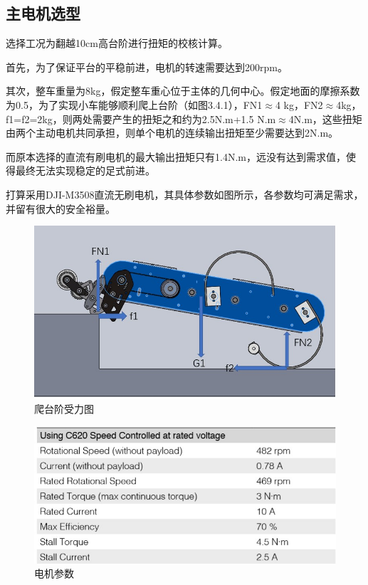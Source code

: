 \documentclass[12pt]{article}
\begin{document}
\begin{CJK}{UTF8}{song}
\subsection{主电机选型}
选择工况为翻越10cm高台阶进行扭矩的校核计算。\par
首先，为了保证平台的平稳前进，电机的转速需要达到200rpm。\par
其次，整车重量为8kg，假定整车重心位于主体的几何中心。假定地面的摩擦系数为0.5，为了实现小车能够顺利爬上台阶（如图3.4.1），FN1$\approx$4 kg，FN2$\approx$4kg，f1=f2=2kg，则两处需要产生的扭矩之和约为2.5N.m+1.5 N.m$\approx$4N.m，这些扭矩由两个主动电机共同承担，则单个电机的连续输出扭矩至少需要达到2N.m。\par
而原本选择的直流有刷电机的最大输出扭矩只有1.4N.m，远没有达到需求值，使得最终无法实现稳定的足式前进。\par
打算采用DJI-M3508直流无刷电机，其具体参数如图所示，各参数均可满足需求，并留有很大的安全裕量。
 \begin{figure}[H]
\centering
\includegraphics[width=.8\textwidth]{chap3//fig6.jpg}
\caption{爬台阶受力图}
\end{figure}
 \begin{figure}[H]
\centering
\includegraphics[width=.8\textwidth]{chap3//fig7.jpg}
\caption{电机参数}
\end{figure}


\end{CJK}
\end{document}
